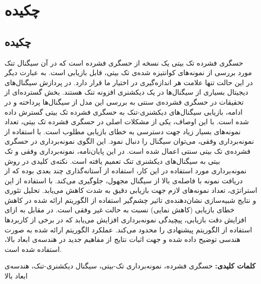 \chapter*{چکیده}
\thispagestyle{empty}
\section*{چکیده}
حسگری فشرده تک بیتی یک نسخه از حسگری فشرده است که در آن سیگنال تنک مورد بررسی از نمونه‌های کوانتیزه شده‌ی تک بیتی، قابل بازیابی است. به عبارت دیگر در این حالت تنها علامت هر اندازه‌گیری در اختیار ما قرار دارد. در پردازش سیگنال‌های دیجیتال بسیاری از سیگنال‌ها در یک دیکشنری افزونه تنک هستند. بخش گسترده‌ای از تحقیقات در حسگری فشرده‌ی سنتی به بررسی این مدل از سیگنال‌ها پرداخته و در ادامه، بازیابی سیگنال‌های دیکشنری-تنک به حسگری فشرده تک بیتی گسترش داده شده است. با این اوصاف، یکی از مشکلات اصلی در حسگری فشرده تک بیتی، تعداد نمونه‌‌های بسیار زیاد جهت دسترسی به خطای بازیابی مطلوب است. با استفاده از نمونه‌برداری وفقی، می‌توان سیگنال 	را دنبال نمود. این الگوی نمونه‌برداری در حسگری فشرده‌ی تک بیتی سنتی اعمال شده است. در این پایان‌نامه، نمونه‌برداری وفقی و تک بیتی به سیگنال‌های دیکشنری تنک تعمیم یافته است. نکته‌ی کلیدی در روش نمونه‌برداری مورد استفاده در این کار، استفاده از آستانه‌گذاری چند بعدی بوده که از دریافت نمونه با فاصله‌ی بالا از سیگنال مجهول، جلوگیری می‌کند. با استفاده از این استراتژی، تعداد نمونه‌های لازم جهت بازیابی دقیق به شدت کاهش می‌یابد.  تحلیل تئوری و نتایج شبیه‌سازی نشان‌دهنده‌ی تاثیر چشم‌گیر استفاده از الگوریتم ارائه شده در کاهش خطای بازیابی (کاهش نمایی) نسبت به حالت غیر وفقی است. در مقابل به ازای افزایش دقت بازیابی، پیچیدگی نمونه‌برداری افزایش می‌یابد که در برخی از کاربرد‌ها استفاده از الگوریتم پیشنهادی را محدود می‌کند. عملکرد الگوریتم ارائه شده به صورت هندسی توضیح داده شده و  جهت اثبات نتایج از مفاهیم جدید در هندسه‌ی ابعاد بالا، استفاده شده است.

\textbf{
کلمات کلیدی:
}
حسگری فشرده، نمونه‌برداری تک-بیتی، سیگنال دیکشنری-تنک، هندسه‌ی ابعاد بالا

